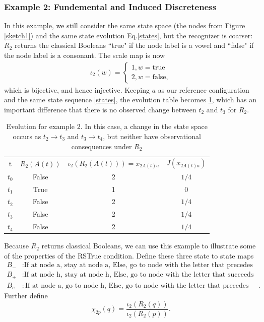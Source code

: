\documentclass[11pt,a4paper]{article}
\begin{document}
\subsubsection{Example 2: Fundemental and Induced Discreteness}
In this example, we still consider the same state space (the nodes from Figure \ref{sketch1}) and the same state evolution Eq.\ref{states}, but the recognizer is coarser: $R_2$ returns the classical Booleans ``true" if the node label is a vowel and ``false" if the node label is a consonant. The scale map is now
\begin{align}
    \iota_2(w)=\begin{cases}
    1, w=\text{true}\\
    2,w=\text{false},
    \end{cases}
\end{align}
which is bijective, and hence injective.
Keeping $a$ as our reference configuration and the same state sequence \ref{states}, the evolution table becomes
\ref{tab:example2}, which has an important difference that there is no observed change between $t_2$ and $t_3$ for $R_2$.
\begin{table}[h]
    \centering
    \begin{tabular}{c|c|c|c}
         t &$R_2(A(t))$&$\iota_2(R_2(A(t)))=x_{2A(t)a}$ &$J(x_{2A(t)a})$ \\
         $t_0$& False&2& $1/4$\\
         $t_1$&True&1&0\\
         $t_2$&False&2&$1/4$\\
         $t_3$&False&2&$1/4$\\
         $t_4$&False&2&$1/4$
    \end{tabular}
    \caption{Evolution for example 2. In this case, a change in the state space occurs as $t_2\rightarrow t_3$ and $t_3\rightarrow t_4$, but neither have observational consequences under $R_2$}
    \label{tab:example2}
\end{table}



Because $R_2$ returns classical Booleans, we can use this example to illustrate some of the properties of the RSTrue condition. Define these three state to state maps
\begin{align}
    B_{-}&:\text{If at node a, stay at node a, Else, go to node with the letter that precedes the current node's letter}\\
    B_{+}&:\text{If at node h, stay at node h, Else, go to node with the letter that succeeds the current node's letter}\\
    B_{c}&: \text{If at node a, go to node h, Else, go to node with the letter that precedes the current node's letter}.
\end{align}
Further define
\begin{equation}
    \chi_{2p}(q)=\frac{\iota_2(R_2(q))}{\iota_2(R_2(p))}.
\end{equation}
\end{document}
